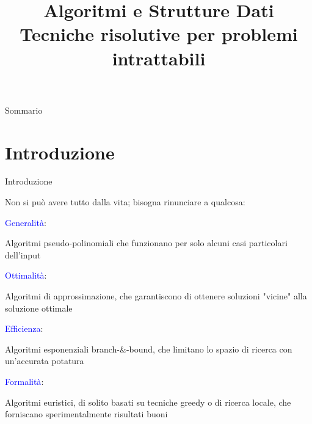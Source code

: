 
\title[ASD - Approssimazione]{\textbf{Algoritmi e Strutture Dati}\\[24pt]Tecniche risolutive per problemi intrattabili}

\usepackage{epigraph}
\usepackage{xcolor}
\usepackage{colortbl}

\newcommand{\PTIME}{\mbox{\sc $\mathbb{P}$}}
\renewcommand{\NP}{\mbox{$\mathbb{NP}$}}
\newcommand{\TIME}{\mbox{$\mathbb{TIME}$}}
\newcommand{\EXPTIME}{\mbox{$\mathbb{EXPTIME}$}}
\newcommand{\SPACE}{\mbox{$\mathbb{SPACE}$}}
\newcommand{\PSPACE}{\mbox{$\mathbb{PSPACE}$}}

\newcommand{\R}[1]{\textcolor{red}{#1}}
\newcommand{\B}[1]{\textcolor{blue}{#1}}

\renewcommand{\arraystretch}{1.4}
\graphicspath{{figs/19/}}
\renewcommand{\enumerazione}{\fontproc{enumeration}}
\newcommand{\isAdmissible}{\fontproc{isAdmissible}}



\FrameTitle{}

\begin{PlainFrame}{Sommario}
\end{PlainFrame}



\section{Introduzione}


\begin{frame}{Introduzione}


Non si può avere tutto dalla vita; bisogna rinunciare a qualcosa:
\BIL
\item \B{Generalità}: 
  \BI
  \item Algoritmi \alert{pseudo-polinomiali} che funzionano per
    solo alcuni casi particolari dell'input
  \EI
\item \B{Ottimalità}: 
  \BI
  \item Algoritmi di \alert{approssimazione}, che garantiscono di ottenere soluzioni "vicine" alla soluzione ottimale
  \EI
\item \B{Efficienza}:
  \BI
  \item Algoritmi esponenziali \alert{branch-\&-bound}, che limitano lo spazio di ricerca con un'accurata potatura
  \EI
\item \B{Formalità}: 
  \BI
  \item Algoritmi \alert{euristici}, di solito basati su tecniche greedy o di ricerca locale, che forniscano sperimentalmente risultati buoni
  \EI
\EIL

\end{frame}

